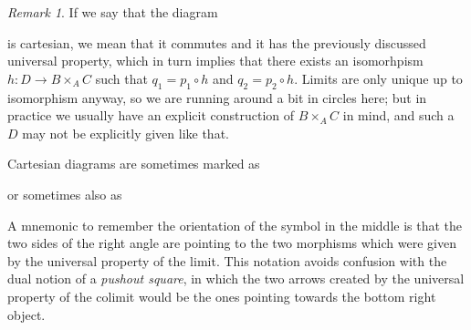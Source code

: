 \documentclass[12pt,a4paper]{amsart}
\theoremstyle{plain}
\theoremstyle{definition}
\theoremstyle{remark}
\newtheorem{rem}[thm]{Remark}
\begin{document}
\begin{rem}\label{rem:cartesian}
  If we say that the diagram
  \begin{center}
  \end{center}
  is cartesian, we mean that it commutes and it has the previously discussed universal property, which in turn implies that there exists an isomorhpism $h\colon D \to B \times_{A} C$ such that $q_{1} = p_{1} \circ h$ and $q_{2} = p_{2} \circ h$.
  Limits are only unique up to isomorphism anyway, so we are running around a bit in circles here; but in practice we usually have an explicit construction of $B \times_{A} C$ in mind, and such a $D$ may not be explicitly given like that.
\end{rem}

Cartesian diagrams are sometimes marked as
\begin{center}
\end{center}
or sometimes also as
\begin{center}
\end{center}
A mnemonic to remember the orientation of the symbol in the middle is that the two sides of the right angle are pointing to the two morphisms which were given by the universal property of the limit.
This notation avoids confusion with the dual notion of a \textit{pushout square}, in which the two arrows created by the universal property of the colimit would be the ones pointing towards the bottom right object.
\end{document}
